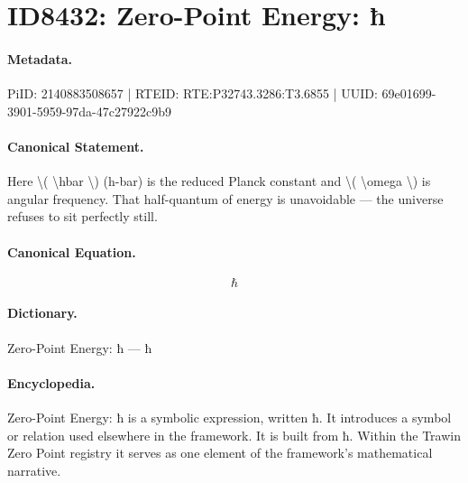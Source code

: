 \section*{ID8432: Zero-Point Energy: ħ}
\paragraph{Metadata.}
PiID: 2140883508657 | RTEID: RTE:P32743.3286:T3.6855 | UUID: 69e01699-3901-5959-97da-47c27922c9b9

\paragraph{Canonical Statement.}
Here \textbackslash{}( \textbackslash{}hbar \textbackslash{}) (h-bar) is the reduced Planck constant and \textbackslash{}( \textbackslash{}omega \textbackslash{}) is angular frequency. That half-quantum of energy is unavoidable — the universe refuses to sit perfectly still.

\paragraph{Canonical Equation.}
\[
\hbar
\]

\paragraph{Dictionary.}
Zero-Point Energy: ħ — ħ

\paragraph{Encyclopedia.}
Zero-Point Energy: ħ is a symbolic expression, written ħ. It introduces a symbol or relation used elsewhere in the framework. It is built from ħ. Within the Trawin Zero Point registry it serves as one element of the framework's mathematical narrative.
